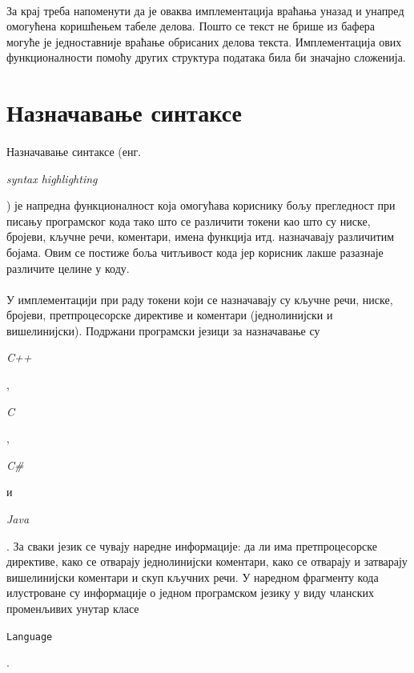 \documentclass[12pt,oneside]{memoir}
\begin{document}
\paragraph{}
За крај треба напоменути да је оваква имплементација враћања уназад и унапред
омогућена коришћењем табеле делова. Пошто се текст не брише из бафера могуће
је једноставније враћање обрисаних делова текста. Имплементација ових 
функционалности помоћу других структура података била би значајно сложенија.

\section{Назначавање синтаксе}

\paragraph{}
Назначавање синтаксе (енг. \begin{latinica}\textit{syntax highlighting}\end{latinica})
је напредна функционалност која омогућава кориснику бољу прегледност при писању
програмског кода тако што се различити токени као што су ниске, бројеви, кључне речи, коментари, имена функција итд. назначавају различитим бојама.  Овим се постиже боља читљивост кода јер корисник лакше разазнаје различите целине у коду.

\paragraph{}
У имплементацији при раду токени који се назначавају су кључне речи, ниске, бројеви, претпроцесорске директиве и коментари (једнолинијски и вишелинијски).
Подржани програмски језици за назначавање су
\begin{latinica}\textit{C++}\end{latinica}, \begin{latinica}\textit{C}\end{latinica},
\begin{latinica}\textit{C\#}\end{latinica} и \begin{latinica}\textit{Java}\end{latinica}. За сваки језик се чувају
наредне информације: да ли има претпроцесорске директиве, како
се отварају једнолинијски коментари, како се отварају и затварају вишелинијски
коментари и скуп кључних речи. У наредном фрагменту кода илустроване су
информације о једном програмском језику у виду чланских променљивих унутар класе \begin{latinica}\verb|Language|\end{latinica}.
\end{document}
